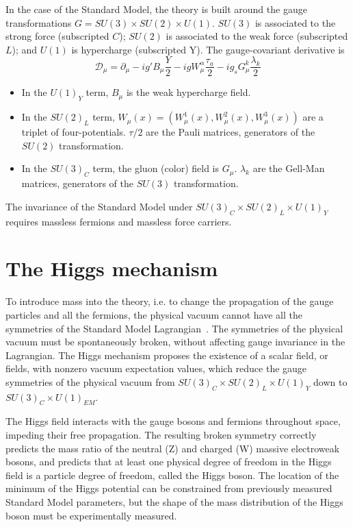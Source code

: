 In the case of the Standard Model, the theory is built around the gauge transformations $G = SU(3) \times SU(2) \times U(1)$. $SU(3)$ is associated to the strong force (subscripted $C$); $SU(2)$ is associated to the weak force (subscripted $L$); and $U(1)$ is hypercharge (subscripted Y). The gauge-covariant derivative  is 
\begin{equation}
    \mathcal{D}_\mu = \partial_\mu - ig' B_\mu \frac{Y}{2} - ig W_{\mu}^{\alpha} \frac{\tau_a}{2} - ig_s G_\mu^{k} \frac{\lambda_k}{2}
\end{equation}
\begin{itemize}
    \item In the $U(1)_Y$ term, $B_\mu$ is the weak hypercharge field.
    \item In the $SU(2)_L$ term, $W_\mu(x) = (W_\mu^1(x), W_\mu^2(x), W_\mu^3(x))$ are a triplet of four-potentials. $\tau/2$ are the Pauli matrices, generators of the $SU(2)$ transformation.
    \item In the $SU(3)_C$ term, the gluon (color) field is $G_\mu$. $\lambda_k$ are the Gell-Man matrices, generators of the $SU(3)$ transformation.
\end{itemize}   
The invariance of the Standard Model under $SU(3)_C \times SU(2)_L \times U(1)_Y$ requires massless fermions and massless force carriers.  

\section{The Higgs mechanism}
\label{section:Higgs-mechanism}
To introduce mass into the theory, i.e. to change the propagation of the gauge particles and all the fermions, the physical vacuum cannot have all the symmetries of the Standard Model Lagrangian~\cite{Tully+2012}. The symmetries of the physical vacuum must be spontaneously broken, without affecting gauge invariance in the Lagrangian. The Higgs mechanism proposes the existence of a scalar field, or fields, with nonzero vacuum expectation values, which reduce the gauge symmetries of the physical vacuum from $SU(3)_C \times SU(2)_L \times U(1)_Y$ down to $SU(3)_C \times U(1)_{EM}$.

The Higgs field interacts with the gauge bosons and fermions throughout space, impeding their free propagation. The resulting broken symmetry correctly predicts the mass ratio of the neutral (Z) and charged (W) massive electroweak bosons, and predicts that at least one physical degree of freedom in the Higgs field is a particle degree of freedom, called the Higgs boson. The location of the minimum of the Higgs potential can be constrained from previously measured Standard Model parameters, but the shape of the mass distribution of the Higgs boson must be experimentally measured.

